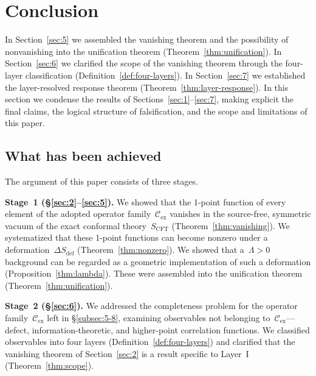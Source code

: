 \documentclass[
  aps,
  prd,
  preprint,
  groupedaddress,
  nofootinbib,
  longbibliography
]{revtex4-2}
\theoremstyle{remark}
\newcommand{\Cex}{\mathcal{C}_{\mathrm{ex}}}
\begin{document}
\section{Conclusion}\label{sec:8}

In Section~\ref{sec:5} we assembled the
vanishing theorem and the possibility of nonvanishing into the
unification theorem (Theorem~\ref{thm:unification}).
In Section~\ref{sec:6} we clarified the scope of the vanishing
theorem through the four-layer classification
(Definition~\ref{def:four-layers}).
In Section~\ref{sec:7} we established the layer-resolved response
theorem (Theorem~\ref{thm:layer-response}).
In this section we condense the results of
Sections~\ref{sec:1}--\ref{sec:7}, making explicit the final
claims, the logical structure of falsification, and the scope
and limitations of this paper.

\subsection{What has been achieved}\label{subsec:8-1}

The argument of this paper consists of three stages.

\textbf{Stage~1 (\S\ref{sec:2}--\ref{sec:5}).}
We showed that the 1-point function of every element of the
adopted operator family~$\Cex$ vanishes in the source-free,
symmetric vacuum of the exact conformal
theory~$S_{\mathrm{CFT}}$
(Theorem~\ref{thm:vanishing}).
We systematized that these 1-point functions can become nonzero
under a deformation~$\Delta S_{\mathrm{def}}$
(Theorem~\ref{thm:nonzero}).
We showed that a~$\Lambda>0$ background can be regarded as a
geometric implementation of such a deformation
(Proposition~\ref{thm:lambda}).
These were assembled into the unification theorem
(Theorem~\ref{thm:unification}).

\textbf{Stage~2 (\S\ref{sec:6}).}
We addressed the completeness problem for the operator
family~$\Cex$ left in \S\ref{subsec:5-8}, examining
observables not belonging to~$\Cex$---defect, information-theoretic,
and higher-point correlation functions.
We classified observables into four layers
(Definition~\ref{def:four-layers}) and clarified that the
vanishing theorem of Section~\ref{sec:2} is a result specific
to Layer~I (Theorem~\ref{thm:scope}).
\end{document}
